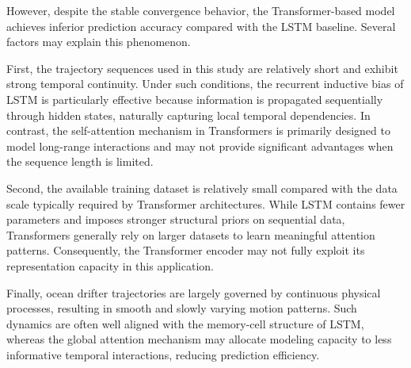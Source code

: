 \documentclass[11pt]{article}
\begin{document}
However, despite the stable convergence behavior, the Transformer-based model achieves inferior prediction accuracy compared with the LSTM baseline. Several factors may explain this phenomenon.

First, the trajectory sequences used in this study are relatively short and exhibit strong temporal continuity. Under such conditions, the recurrent inductive bias of LSTM is particularly effective because information is propagated sequentially through hidden states, naturally capturing local temporal dependencies. In contrast, the self-attention mechanism in Transformers is primarily designed to model long-range interactions and may not provide significant advantages when the sequence length is limited.

Second, the available training dataset is relatively small compared with the data scale typically required by Transformer architectures. While LSTM contains fewer parameters and imposes stronger structural priors on sequential data, Transformers generally rely on larger datasets to learn meaningful attention patterns. Consequently, the Transformer encoder may not fully exploit its representation capacity in this application.

Finally, ocean drifter trajectories are largely governed by continuous physical processes, resulting in smooth and slowly varying motion patterns. Such dynamics are often well aligned with the memory-cell structure of LSTM, whereas the global attention mechanism may allocate modeling capacity to less informative temporal interactions, reducing prediction efficiency.
\end{document}

